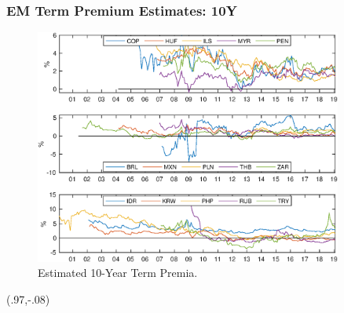 \documentclass[12pt, aspectratio=169, xcolor=dvipsnames]{beamer} 			         %
\begin{document}
\begin{frame}[label=tp_10yrA]
	\frametitle{EM Term Premium Estimates: 10Y}
	\begin{figure}[!htbp]
		\begin{center}
			\includegraphics[trim={0 8.95cm 0 0}, clip, width=0.9\textwidth, height=0.65\textheight]{../Figures/Temp/temp_tp10yrEM}
			\par\end{center}
		\caption{Estimated 10-Year Term Premia.}\label{fig:tp_10yrA}
	\end{figure}
	\begin{textblock*}{3cm}(.97\textwidth,-.08\textheight)
		\hyperlink{tp_10yrB}{}
	\end{textblock*}
\end{frame}
\end{document}
